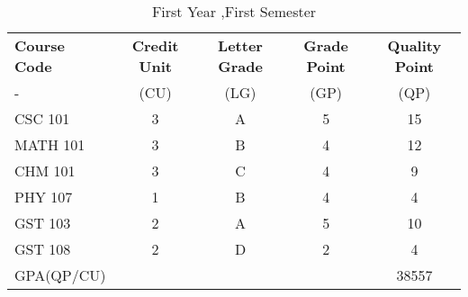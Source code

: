 \documentclass{article}
\begin{document}
	\begin{table}[h!]
		\begin{center}
			\caption{First Year ,First Semester}
			\label{tab:Table 1}
			\begin{tabular}{|l|c|c|c|c}
			\cellcolor{red!20}\textbf{Course Code}&\cellcolor{red!20}\textbf{Credit Unit}&\cellcolor{red!20}\textbf{Letter Grade}&\cellcolor{red!20}\textbf{Grade Point}&\cellcolor{red!20}\textbf{Quality Point}\\
				\cellcolor{blue!20}-&\cellcolor{blue!20}(CU)&\cellcolor{blue!20}(LG)&\cellcolor{blue!20}(GP)&\cellcolor{blue!20}(QP)\\
				\hline
		       \cellcolor{blue!10}CSC 101&3&A&5&15\\
				\cellcolor{blue!10}MATH 101&3&B&4&12\\
				\cellcolor{blue!10}CHM 101&3&C&4&9\\
				\cellcolor{blue!10}PHY 107&1&B&4&4\\
				\cellcolor{blue!10}GST 103&2&A&5&10\\
				\cellcolor{blue!10}GST 108&2&D&2&4\\
		    	\cellcolor{yellow}GPA(QP/CU)&	\cellcolor{yellow} &	\cellcolor{yellow} &	\cellcolor{yellow} & 	\cellcolor{yellow}38557\\
				
				\end{tabular}
			\end{center}
		\end{table}
\end{document}
